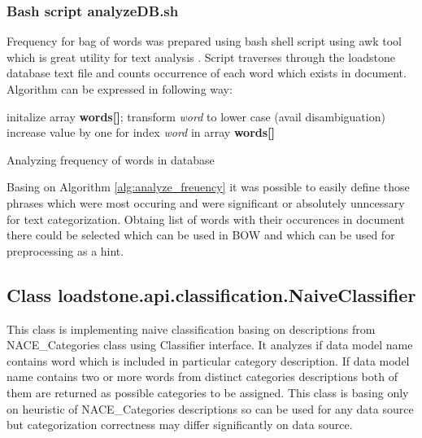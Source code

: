 \subsubsection{Bash script analyzeDB.sh}
\label{analyze_db}
Frequency for bag of words was prepared using bash shell script using awk tool which is great utility for text analysis \cite{21}. Script traverses through the loadstone database text file and counts occurrence of each word which exists in document. Algorithm can be expressed in following way:
\begin{algorithm}[h]
	initalize array \textbf{words[]};
	\newline
	{
		transform \textit{word} to lower case (avail disambiguation)
		\newline
		increase value by one for index \textit{word} in array \textbf{words[]} 
	}
\caption{Analyzing frequency of words in database}\label{alg:analyze_freuency}
\end{algorithm}

Basing on Algorithm \ref{alg:analyze_freuency} it was possible to easily define those phrases which were most occuring and were significant or absolutely unncessary for text categorization. Obtaing list of words with their occurences in document there could be selected which can be used in BOW and which can be used for preprocessing as a hint.

\subsection{Class \newline loadstone.api.classification.NaiveClassifier}
\label{naive_classifier}
This class is implementing naive classification basing on descriptions from NACE\_Categories class using Classifier interface. It analyzes if data model name contains word which is included in particular category description. If data model name contains two or more words from distinct categories descriptions both of them are returned as possible categories to be assigned. This class is basing only on heuristic of NACE\_Categories descriptions so can be used for any data source but categorization correctness may differ significantly on data source.

